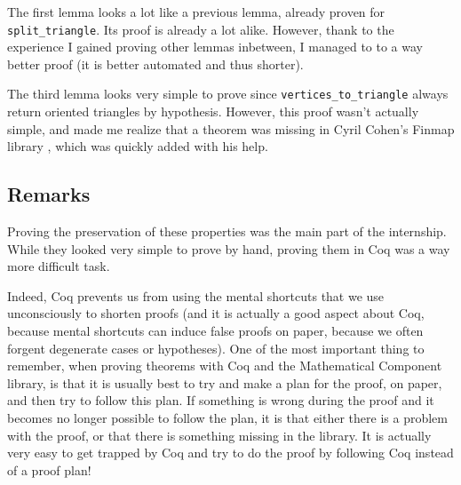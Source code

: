 \documentclass[a4paper,10pt]{article}
\begin{document}
The first lemma looks a lot like a previous lemma, already proven for {\tt split\_triangle}. Its proof is already a lot alike. However, thank to the experience I gained proving other lemmas inbetween, I managed to to a way better proof (it is better automated and thus shorter).

The third lemma looks very simple to prove since {\tt vertices\_to\_triangle} always return oriented triangles by hypothesis. However, this proof wasn't actually simple, and made me realize that a theorem was missing in Cyril Cohen's Finmap library \cite{finmap}, which was quickly added with his help.

\subsection{Remarks}

Proving the preservation of these properties was the main part of the internship. While they looked very simple to prove by hand, proving them in {\sc Coq} was a way more difficult task.

Indeed, {\sc Coq} prevents us from using the mental shortcuts that we use unconsciously to shorten proofs (and it is actually a good aspect about {\sc Coq}, because mental shortcuts can induce false proofs on paper, because we often forgent degenerate cases or hypotheses). One of the most important thing to remember, when proving theorems with {\sc Coq} and the {\sc Mathematical Component} library, is that it is usually best to try and make a plan for the proof, on paper, and then try to follow this plan.  If something is wrong during the proof and it becomes no longer possible to follow the plan, it is that either there is a problem with the proof, or that there is something missing in the library. It is actually very easy to get trapped by {\sc Coq} and try to do the proof by following {\sc Coq} instead of a proof plan!
\end{document}
